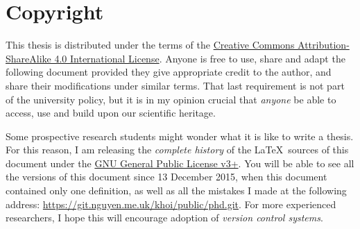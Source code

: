 \chapter*{Copyright}

This thesis is distributed under the terms of the
\href{http://creativecommons.org/licenses/by-sa/4.0/}{Creative Commons Attribution-ShareAlike 4.0 International License}.
Anyone is free to use, share and adapt the following document
provided they give appropriate credit to the author,
and share their modifications under similar terms.
That last requirement is not part of the university policy,
but it is in my opinion crucial that \emph{anyone} be able to access, use and build upon our scientific heritage.

Some prospective research students might wonder what it is like to write a thesis.
For this reason, I am releasing the \emph{complete history} of the \LaTeX\ sources of this document
under the \href{https://www.gnu.org/licenses/gpl.html}{GNU General Public License v3+}.
You will be able to see all the versions of this document since 13 December 2015,
when this document contained only one definition,
as well as all the mistakes I made at the following address:
\url{https://git.nguyen.me.uk/khoi/public/phd.git}.
For more experienced researchers, I hope this will encourage adoption of \emph{version control systems}.
